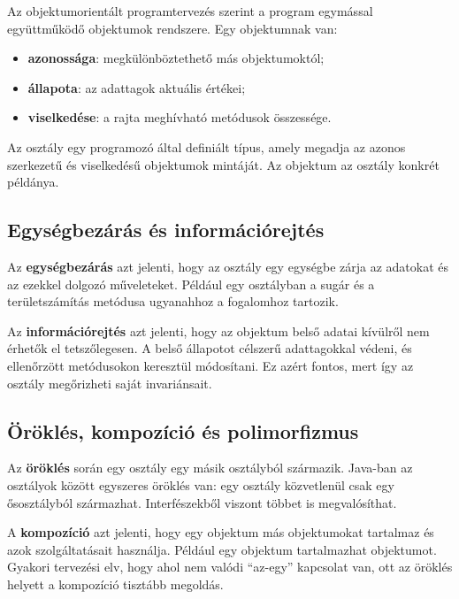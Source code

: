 Az objektumorientált programtervezés szerint a program egymással együttműködő objektumok rendszere. Egy objektumnak van:

\begin{itemize}
  \item \textbf{azonossága}: megkülönböztethető más objektumoktól;
  \item \textbf{állapota}: az adattagok aktuális értékei;
  \item \textbf{viselkedése}: a rajta meghívható metódusok összessége.
\end{itemize}

Az osztály egy programozó által definiált típus, amely megadja az azonos szerkezetű és viselkedésű objektumok mintáját. Az objektum az osztály konkrét példánya.

\begin{center}

\end{center}

\subsection{Egységbezárás és információrejtés}

Az \textbf{egységbezárás} azt jelenti, hogy az osztály egy egységbe zárja az adatokat és az ezekkel dolgozó műveleteket. Például egy  osztályban a sugár és a területszámítás metódusa ugyanahhoz a fogalomhoz tartozik.

Az \textbf{információrejtés} azt jelenti, hogy az objektum belső adatai kívülről nem érhetők el tetszőlegesen. A belső állapotot célszerű  adattagokkal védeni, és ellenőrzött metódusokon keresztül módosítani. Ez azért fontos, mert így az osztály megőrizheti saját invariánsait.

\subsection{Öröklés, kompozíció és polimorfizmus}

Az \textbf{öröklés} során egy osztály egy másik osztályból származik. Java-ban az osztályok között egyszeres öröklés van: egy osztály közvetlenül csak egy ősosztályból származhat. Interfészekből viszont többet is megvalósíthat.

A \textbf{kompozíció} azt jelenti, hogy egy objektum más objektumokat tartalmaz és azok szolgáltatásait használja. Például egy  objektum tartalmazhat  objektumot. Gyakori tervezési elv, hogy ahol nem valódi ``az-egy'' kapcsolat van, ott az öröklés helyett a kompozíció tisztább megoldás.

